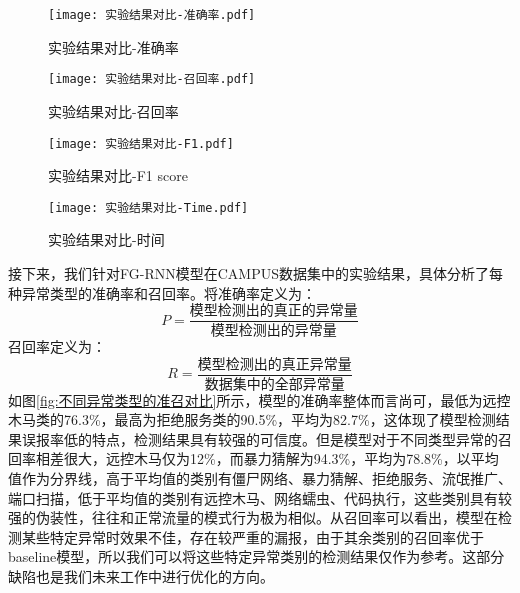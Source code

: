   \begin{figure}[htbp]
    \centering
    \begin{minipage}[t]{0.48\textwidth}
    \centering
    \texttt{[image: 实验结果对比-准确率.pdf]}
    \caption{实验结果对比-准确率}
    \end{minipage}
    \begin{minipage}[t]{0.48\textwidth}
    \centering
    \texttt{[image: 实验结果对比-召回率.pdf]}
    \caption{实验结果对比-召回率}
    \end{minipage}
    \end{figure}

    \begin{figure}[htbp]
      \centering
      \begin{minipage}[t]{0.48\textwidth}
      \centering
      \texttt{[image: 实验结果对比-F1.pdf]}
      \caption{实验结果对比-F1 score}
      \end{minipage}
      \begin{minipage}[t]{0.48\textwidth}
      \centering
      \texttt{[image: 实验结果对比-Time.pdf]}
      \caption{实验结果对比-时间}
      \end{minipage}
      \end{figure}

接下来，我们针对FG-RNN模型在CAMPUS数据集中的实验结果，具体分析了每种异常类型的准确率和召回率。将准确率定义为：
\begin{equation}
  P = \frac{\mbox{模型检测出的真正的异常量}}{\mbox{模型检测出的异常量}}
\end{equation}
召回率定义为：
\begin{equation}
  R = \frac{\mbox{模型检测出的真正异常量}}{\mbox{数据集中的全部异常量}}
\end{equation}
如图\ref{fig:不同异常类型的准召对比}所示，模型的准确率整体而言尚可，最低为远控木马类的76.3\%，最高为拒绝服务类的90.5\%，平均为82.7\%，这体现了模型检测结果误报率低的特点，检测结果具有较强的可信度。但是模型对于不同类型异常的召回率相差很大，远控木马仅为12\%，而暴力猜解为94.3\%，平均为78.8\%，以平均值作为分界线，高于平均值的类别有僵尸网络、暴力猜解、拒绝服务、流氓推广、端口扫描，低于平均值的类别有远控木马、网络蠕虫、代码执行，这些类别具有较强的伪装性，往往和正常流量的模式行为极为相似。从召回率可以看出，模型在检测某些特定异常时效果不佳，存在较严重的漏报，由于其余类别的召回率优于baseline模型，所以我们可以将这些特定异常类别的检测结果仅作为参考。这部分缺陷也是我们未来工作中进行优化的方向。

